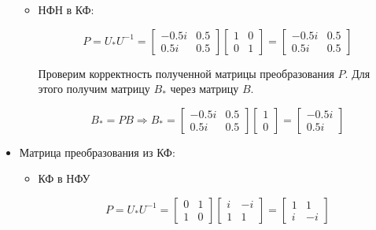 \begin{itemize}
\begin{itemize}
	
	
	\item НФН в КФ:
	
	\begin{equation*}
	\text{$P=U_{*}U^{-1}=
	\begin{bmatrix}  -0.5i  &  0.5 \\
    0.5i  & 0.5 \end{bmatrix}
\begin{bmatrix} 1  &      0 \\
         0  &  1 \end{bmatrix}
=\begin{bmatrix}   -0.5i &    0.5 \\
    0.5i  & 0.5 \end{bmatrix}$}
	\end{equation*}
	
	Проверим корректность полученной матрицы преобразования $P$. Для этого получим матрицу $B_{*}$ через матрицу $B$.
	
	\begin{equation*}
	\text{$B_{*}=PB$}
	\Longrightarrow
	\text{$B_{*}=
\begin{bmatrix}   -0.5i &    0.5 \\
    0.5i  & 0.5 \end{bmatrix}
    \begin{bmatrix} 1 \\ 0 \end{bmatrix}
   =\begin{bmatrix} -0.5i \\ 0.5i \end{bmatrix}$}
	\end{equation*}
	

	\end{itemize}	
	
	\item Матрица преобразования из КФ:
	\begin{itemize}
	\item КФ в НФУ

\begin{equation*}
	\text{$P=U_{*}U^{-1}=
	\begin{bmatrix}
0 & 1\\ 1 & 0
\end{bmatrix}
\begin{bmatrix}i &   -i \\
    1  &  1 \end{bmatrix}
    =\begin{bmatrix}1  &  1 \\
   i  & -i\end{bmatrix}$}
	\end{equation*}
	

\end{itemize}
\end{itemize}
